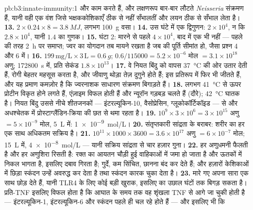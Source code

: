 \begin{solution}{pb:b3:innate-immunity:1}
 और  काम करते हैं, और लक्षणरूप बार-बार लौटते
\emph{Neisseria} संक्रमण हैं, यानी वही एक वंश जिसे भक्षककोशिकाएँ ठीक
से नहीं सँभालतीं और लयन ठीक से सँभाल लेता है।
\textbf{13.} $2\times 0.24\times 8 = \qty{3.8}{MJ}$, लगभग \qty{100}{g}
वसा।
\textbf{14.} उस घंटे में एक द्विगुणन: $2\times 10^{4}$, न कि
$2.8\times 10^{4}$, यानी $1.4$ का गुणक।
\textbf{15.} घंटा 2: मारने से पहले $4\times 10^{4}$, बाद में एक भी नहीं
--- पहले की तरह \qty{2}{h} पर समाप्त; ज्वर का योगदान तब मायने रखता है
जब  की पूर्ति सीमांत हो, जैसा प्रश्न 4 और 6 में।
\textbf{16.} $199\,\text{mg/L}\times 3\,\text{L} = \qty{0.6}{g}$; $0.6/
\num{115000} = 5.2\times 10^{-6}$ मोल $= 3.1\times 10^{18}$ अणु;
\qty{172800}{s} में, प्रति सेकंड $1.8\times 10^{13}$।
\textbf{17.} वे नियत बिंदु को वापस \qty{37}{\celsius} की ओर उतार देती
हैं, रोगी बेहतर महसूस करता है, और जीवाणु थोड़ा तेज़ दुगुने होते हैं; इस
प्रतिरूप में  फिर भी जीतते हैं, और यह प्रमाण कमज़ोर है कि
ज्वरनाशक साधारण संक्रमण बिगाड़ते हैं।
\textbf{18.} लगभग \qty{41}{\celsius} से ऊपर प्रोटीन विकृत होने लगते हैं,
एंज़ाइम विफल होती हैं और न्यूरॉन गड़बड़ चलते हैं (दौरे);
\qty{42}{\celsius} घातक है। नियत बिंदु उससे नीचे शीतजनकों ---
इंटरल्यूकिन-10, वैसोप्रेसिन, ग्लूकोकॉर्टिकॉइड --- से और अधश्चेतक में
प्रोस्टाग्लैंडिन-क्रिया की छत से थमा रहता है।
\textbf{19.} $10^{9}\times 3\times 10^{6} = 3\times 10^{15}$ अणु
$= 5\times 10^{-9}$ मोल, \qty{5}{L} में: \qty{1e-9}{mol/L}।
\textbf{20.} संतृप्तकारी सांद्रता के बराबर: शरीर का हर  एक साथ
अधिकतम सक्रिय है।
\textbf{21.} $10^{11}\times 1000\times 3600 = 3.6\times 10^{17}$ अणु
$= 6\times 10^{-7}$ मोल; \qty{15}{L} में, \qty{4e-8}{mol/L} --- यानी
सक्रिय सांद्रता से चार हज़ार गुना।
\textbf{22.} हर अणुधमनी फैलती है और हर अणुशिरा रिसती है: रक्त का आयतन
चौड़ी हुई वाहिकाओं में जमा हो जाता है और ऊतकों में निकल भागता है,
इसलिए दबाव गिरता है; गुर्दे, कम सिंचित, छानना बंद कर देते हैं; और
हज़ारों केशिकाओं में छिड़ा स्कंदन उन्हें अवरुद्ध कर देता है तथा स्कंदन
कारक चुका देता है।
\textbf{23.} मारे गए  अपना सारा  एक साथ
छोड़ देते हैं, यानी TLR4 के लिए कोई बड़ी खुराक, इसलिए  का उछाल
घंटों तक बिगड़ सकता है। प्रति-TNF इसलिए विफल होता है कि आघात के समय तक
वह शृंखला TNF से आगे जा चुकी होती है --- इंटरल्यूकिन-1,
इंटरल्यूकिन-6 और स्कंदन पहले ही चल रहे होते हैं --- और इसलिए भी कि

\end{solution}

